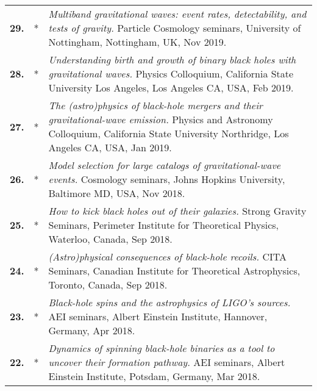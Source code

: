 \documentclass[11pt,letterpaper,sans]{moderncv}   %
\begin{document}
{\begin{longtable}{rp{0.4cm}p{15.8cm}}
\textbf{29.} & *& \textit{Multiband gravitational waves: event rates, detectability, and tests of gravity.}
\newline{} 
%
Particle Cosmology seminars, University of Nottingham, Nottingham, UK, Nov 2019.
\vspace{0.05cm}\\
\textbf{28.} & *& \textit{Understanding birth and growth of binary black holes with gravitational waves.}
\newline{} 
Physics Colloquium, California State University Los Angeles, Los Angeles CA, USA, Feb 2019.
\vspace{0.05cm}\\
%
\textbf{27.} & *& \textit{The (astro)physics of black-hole mergers and their gravitational-wave emission.}
\newline{} 
Physics and Astronomy Colloquium, California State University Northridge, Los Angeles CA, USA, Jan 2019.
\vspace{0.05cm}\\
%
\textbf{26.} & *& \textit{Model selection for large catalogs of gravitational-wave events.}
\newline{} 
Cosmology seminars, Johns Hopkins University, Baltimore MD, USA, Nov 2018.
\vspace{0.05cm}\\
%
\textbf{25.} & *& \textit{How to kick black holes out of their galaxies.}
\newline{} 
Strong Gravity Seminars, Perimeter Institute for Theoretical Physics, Waterloo, Canada, Sep 2018.
\vspace{0.05cm}\\
%
\textbf{24.} & *& \textit{(Astro)physical consequences of black-hole recoils.}
\newline{} 
CITA Seminars, Canadian Institute for Theoretical Astrophysics, Toronto, Canada, Sep 2018.
\vspace{0.05cm}\\
%
\textbf{23.} & *& \textit{Black-hole spins and the astrophysics of LIGO's sources.}
\newline{} 
AEI seminars, Albert Einstein Institute, Hannover, Germany, Apr 2018.
\vspace{0.05cm}\\
%
\textbf{22.} & *& \textit{Dynamics of spinning black-hole binaries as a tool to uncover their formation pathway.}
\newline{} 
AEI seminars, Albert Einstein Institute, Potsdam, Germany, Mar 2018.
\vspace{0.05cm}\\

\end{longtable}}
\end{document}
